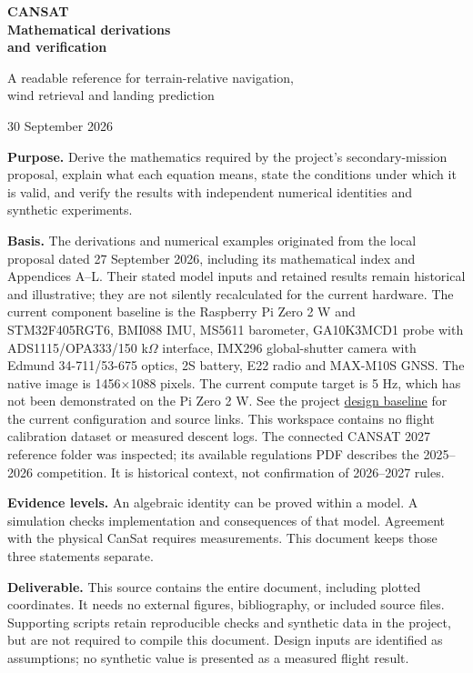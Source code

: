 \documentclass[11pt,a4paper]{article}
\numberwithin{equation}{section}
\begin{document}
\begin{titlepage}
\vspace*{16mm}
{\color{atlasblue}\Huge\bfseries CANSAT\\[4mm] Mathematical derivations\\[4mm] and verification\par}
\vspace{9mm}
{\Large A readable reference for terrain-relative navigation,\\wind retrieval and landing prediction\par}
\vspace{8mm}
{\large 30 September 2026\par}
\vspace{14mm}
\textbf{Purpose.} Derive the mathematics required by the project's secondary-mission proposal, explain what each equation means, state the conditions under which it is valid, and verify the results with independent numerical identities and synthetic experiments.

\textbf{Basis.} The derivations and numerical examples originated from the local proposal dated 27 September 2026, including its mathematical index and Appendices A--L. Their stated model inputs and retained results remain historical and illustrative; they are not silently recalculated for the current hardware. The current component baseline is the Raspberry Pi Zero 2 W and STM32F405RGT6, BMI088 IMU, MS5611 barometer, GA10K3MCD1 probe with ADS1115/OPA333/150 k$\Omega$ interface, IMX296 global-shutter camera with Edmund 34-711/53-675 optics, 2S battery, E22 radio and MAX-M10S GNSS. The native image is 1456$\times$1088 pixels. The current compute target is 5 Hz, which has not been demonstrated on the Pi Zero 2 W. See the project \href{run:design_baseline.md}{design baseline} for the current configuration and source links. This workspace contains no flight calibration dataset or measured descent logs. The connected CANSAT 2027 reference folder was inspected; its available regulations PDF describes the 2025--2026 competition. It is historical context, not confirmation of 2026--2027 rules.

\textbf{Evidence levels.} An algebraic identity can be proved within a model. A simulation checks implementation and consequences of that model. Agreement with the physical CanSat requires measurements. This document keeps those three statements separate.

\textbf{Deliverable.} This source contains the entire document, including plotted coordinates. It needs no external figures, bibliography, or included source files. Supporting scripts retain reproducible checks and synthetic data in the project, but are not required to compile this document.
\vfill
{\small Design inputs are identified as assumptions; no synthetic value is presented as a measured flight result.}
\end{titlepage}
\tableofcontents
\clearpage
\end{document}
